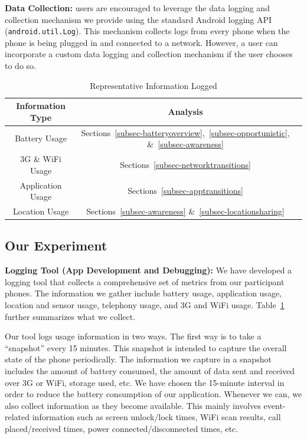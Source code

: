 {\bf Data Collection:} \PhoneLab{} users are encouraged to leverage the data
logging and collection mechanism we provide using the standard Android logging
API (\texttt{android.util.Log}). This mechanism collects logs from every phone
when the phone is being plugged in and connected to a network. However, a
\PhoneLab{} user can incorporate a custom data logging and collection mechanism
if the user chooses to do so.

\begin{table}[t]
\centering
\begin{tabular}{|c|c|c|}
\hline
Information Type & Analysis\\
\hline
Battery Usage &
Sections~\ref{subsec-batteryoverview},~\ref{subsec-opportunistic},
\&~\ref{subsec-awareness}\\
3G \& WiFi Usage & Sections~\ref{subsec-networktransitions}\\
Application Usage & Sections~\ref{subsec-apptransitions}\\
Location Usage & Sections~\ref{subsec-awareness}
\&~\ref{subsec-locationsharing}\\
\hline
\end{tabular}
\caption{Representative Information Logged }
\label{tab:information-logged}
\end{table}


\subsection{Our Experiment}

{\bf Logging Tool (App Development and Debugging):} We have developed a logging
tool that collects a comprehensive set of metrics from our participant phones.
The information we gather include battery usage, application usage, location and
sensor usage, telephony usage, and 3G and WiFi usage.
Table~\ref{tab:information-logged} further summarizes what we collect.

Our tool logs usage information in two ways. The first way is to take a
``snapshot'' every 15 minutes. This snapshot is intended to capture the overall
state of the phone periodically. The information we capture in a snapshot
includes the amount of battery consumed, the amount of data sent and received
over 3G or WiFi, storage used, etc. We have chosen the 15-minute interval in
order to reduce the battery consumption of our application. Whenever we can, we also collect information
as they become available. This mainly involves event-related information such as
screen unlock/lock times, WiFi scan results, call placed/received times, power
connected/disconnected times, etc.

